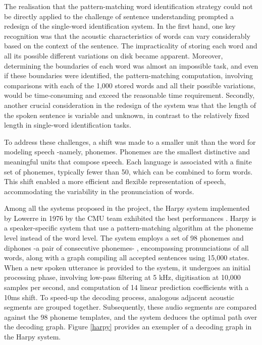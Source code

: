 The realisation that the pattern-matching word identification strategy could not be directly applied to the challenge of sentence understanding prompted a redesign of the single-word identification system. In the first hand, one key recognition was that the acoustic characteristics of words can vary considerably based on the context of the sentence. The impracticality of storing each word and all its possible different variations on disk became apparent. Moreover, determining the boundaries of each word  was almost an impossible task, and even if these boundaries were identified, the pattern-matching computation, involving comparisons with each of the 1,000 stored words and all their possible variations, would be time-consuming and exceed the reasonable time requirement. Secondly, another crucial consideration in the redesign of the system was that the length of the spoken sentence is variable and unknown, in contrast to the relatively fixed length in single-word identification tasks.

To address these challenges, a shift was made to a smaller unit than the word for modeling speech -namely, phonemes. Phonemes are the smallest distinctive and meaningful units that compose speech. Each language is associated with a finite set of phonemes, typically fewer than 50, which can be combined to form words. This shift enabled a more efficient and flexible representation of speech, accommodating the variability in the pronunciation of words.

Among all the systems proposed in the project, the Harpy system implemented by Lowerre in 1976 by the \ac{CMU} team exhibited the best performances \cite{klatt1977review}. Harpy is a speaker-specific system that use a pattern-matching algorithm at the phoneme level instead of the word level. The system employs a set of 98 phonemes and diphones -a pair of consecutive phonemes- , encompassing pronunciations of all words, along with a graph compiling all accepted sentences using 15,000 states. When a new spoken utterance is provided to the system, it undergoes an initial processing phase, involving low-pass filtering at 5 k\ac{Hz}, digitisation at 10,000 samples per second, and computation of 14 linear prediction coefficients with a 10ms shift. To speed-up the decoding process, analogous adjacent acoustic segments are grouped together. Subsequently, these audio segments are compared against the 98 phoneme templates, and the system deduces the optimal path over the decoding graph. Figure \ref{harpy} provides an exempler of a decoding graph in the Harpy system.


